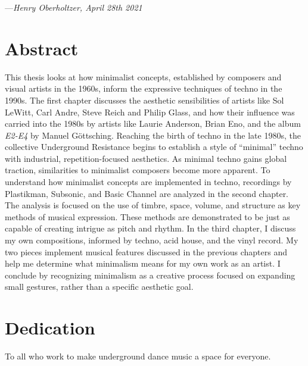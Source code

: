 \documentclass[12pt,twoside]{reedthesis}
\begin{document}
---\emph{Henry Oberholtzer, April 28th 2021}



\tableofcontents

\listoffigures

\chapter*{Abstract}


This thesis looks at how minimalist concepts, established by composers and visual artists in the 1960s, inform the expressive techniques of techno in the 1990s. The first chapter discusses the aesthetic sensibilities of artists like Sol LeWitt, Carl Andre, Steve Reich and Philip Glass, and how their influence was carried into the 1980s by artists like Laurie Anderson, Brian Eno, and the album \emph{E2-E4} by Manuel G{\"o}ttsching. Reaching the birth of techno in the late 1980s, the collective Underground Resistance begins to establish a style of ``minimal'' techno with industrial, repetition-focused aesthetics. As minimal techno gains global traction, similarities to minimalist composers become more apparent. To understand how minimalist concepts are implemented in techno, recordings by Plastikman, Subsonic, and Basic Channel are analyzed in the second chapter. The analysis is focused on the use of timbre, space, volume, and structure as key methods of musical expression. These methods are demonstrated to be just as capable of creating intrigue as pitch and rhythm. In the third chapter, I discuss my own compositions, informed by techno, acid house, and the vinyl record. My two pieces implement musical features discussed in the previous chapters and help me determine what minimalism means for my own work as an artist. I conclude by recognizing minimalism as a creative process focused on expanding small gestures, rather than a specific aesthetic goal.

\chapter*{Dedication}
To all who work to make underground dance music a space for everyone.

\mainmatter %
\pagestyle{fancyplain} %

\end{document}

